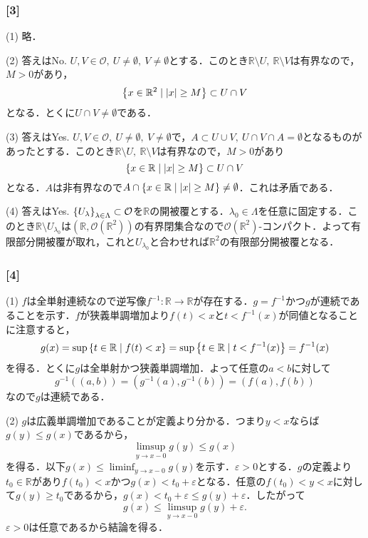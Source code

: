 \documentclass[a4j]{ltjsarticle}
\newcommand{\Rset}{\mathbb{R}}
\newcommand{\1}{\mathbbm{1}}
\numberwithin{equation}{section}
\theoremstyle{definition}
\begin{document}
\subsubsection*{[3]}
(1) 略．

(2) 答えはNo. $U,V\in\mathcal{O},\ U\neq\emptyset,\ V\neq \emptyset$とする．このとき$\Rset\setminus U,\ \Rset\setminus V$は有界なので，$M>0$があり，
\begin{equation}
    \qty{x\in\Rset^2\mid \abs{x}\geq M}\subset U\cap V 
\end{equation}
となる．とくに$U\cap V\neq\emptyset$である．

(3) 答えはYes. $U,V\in\mathcal{O},\ U\neq\emptyset,\ V\neq\emptyset$で，$A\subset U\cup V,\ U\cap V\cap A=\emptyset $となるものがあったとする．このとき$\Rset\setminus U,\ \Rset\setminus V$は有界なので，$M>0$があり
\begin{equation}
    \qty{x\in\Rset\mid \abs{x}\geq M}\subset U\cap V 
\end{equation}
となる．$A$は非有界なので$A\cap \qty{x\in\Rset\mid \abs{x}\geq M}\neq\emptyset$．これは矛盾である．

(4) 答えはYes. $\qty{U_{\lambda}}_{\lambda\in\Lambda}\subset \mathcal{O}$を$\Rset$の開被覆とする．$\lambda_{0}\in\Lambda$を任意に固定する．このとき$\Rset\setminus U_{\lambda_{0}}$は$(\Rset,\mathcal{O}(\Rset^2))$の有界閉集合なので$\mathcal{O}(\Rset^2)$-コンパクト．よって有限部分開被覆が取れ，これと$U_{\lambda_{0}}$と合わせれば$\Rset^2$の有限部分開被覆となる．
\subsubsection*{[4]}
(1) $f$は全単射連続なので逆写像$f^{-1}\colon \Rset\to\Rset$が存在する．$g=f^{-1}$かつ$g$が連続であることを示す．$f$が狭義単調増加より$f(t)<x$と$t<f^{-1}(x)$が同値となることに注意すると，
\begin{equation}
    g(x)=\sup\qty{t\in\Rset\mid f(t)<x}=\sup\qty{t\in\Rset\mid t<f^{-1}(x)}=f^{-1}(x)
\end{equation}
を得る．とくに$g$は全単射かつ狭義単調増加．よって任意の$a<b$に対して
\begin{equation}
    g^{-1}((a,b))=(g^{-1}(a),g^{-1}(b))=(f(a),f(b))
\end{equation}
なので$g$は連続である．

(2) $g$は広義単調増加であることが定義より分かる．つまり$y<x$ならば$g(y)\leq g(x)$であるから，
\begin{equation}
    \limsup_{y\to x-0}g(y)\leq g(x)
\end{equation}
を得る．以下$g(x)\leq \liminf_{y\to x-0}g(y)$を示す．$\varepsilon>0$とする．$g$の定義より$t_0\in\Rset$があり$f(t_0)<x$かつ$g(x)<t_0+\varepsilon$となる．任意の$f(t_0)<y<x$に対して$g(y)\geq t_0$であるから，$g(x)<t_0+\varepsilon\leq g(y)+\varepsilon$．したがって
\begin{equation}
    g(x)\leq\limsup_{y\to x-0}g(y)+\varepsilon .
\end{equation}
$\varepsilon>0$は任意であるから結論を得る．
\end{document}
